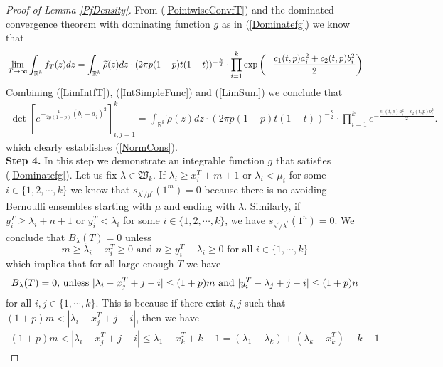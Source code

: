 \begin{proof}[Proof of Lemma \ref{PfDensity}]
From (\ref{PointwiseConvfT}) and the dominated convergence theorem with dominating function $g$ as in (\ref{Dominatefg}) we know that
\begin{equation}
	\begin{split}{\label{LimIntfT}}
	\lim_{T\rightarrow\infty}\int_{\mathbb{R}^{k}}f_T(z)dz=\int_{\mathbb{R}^k}\widetilde{\rho}(z)dz \cdot(2\pi p(1-p)t(1-t))^{-\frac{k}{2}}\cdot\prod_{i=1}^{k}\exp\left(-\frac{c_{1}(t,p)a_i^2+c_2(t,p)b_i^2}{2}\right)
\end{split}
\end{equation}
Combining (\ref{LimIntfT}), (\ref{IntSimpleFunc})  and (\ref{LimSum}) we conclude that
\begin{equation}
	\begin{split}
		\det\left[e^{-\frac{1}{2p(1-p)}(b_i-a_j)^2}\right]_{i,j=1}^{k}=\int_{\mathbb{R}^k}\widetilde{\rho}(z)dz\cdot(2\pi p(1-p)t(1-t))^{-\frac{k}{2}}\cdot\prod_{i=1}^{k}e^{-\frac{c_1(t,p)a_i^2+c_2(t,p)b_i^2}{2}}.
	\end{split}
\end{equation}
which clearly establishes (\ref{NormCons}).\\
\textbf{Step 4. }In this step we demonstrate an integrable function $g$ that satisfies (\ref{Dominatefg}). Let us fix $\lambda\in\mathfrak{W}_k$. If $\lambda_i\geq x_{i}^{T}+m+1$ or $\lambda_i<\mu_{i}$ for some $i\in\{1,2,\cdots,k\}$ we know that $s_{\lambda^{\prime}/\mu^{\prime}}(1^m)=0$ because there is no avoiding Bernoulli ensembles starting with $\mu$ and ending with $\lambda$. Similarly, if $y_{i}^T\geq \lambda_i+n+1$ or $y_{i}^T< \lambda_i$ for some $i\in\{1,2,\cdots,k\}$, we have $s_{\kappa^{\prime}/\lambda^{\prime}}(1^n)=0$. We conclude that $B_{\lambda}(T)=0$ unless
$$m\geq \lambda_i-x^{T}_i\geq 0\text{ and } n\geq y^{T}_i-\lambda_i\geq 0\text{ for all } i\in\{1,\cdots,k\}$$
which implies that for all large enough $T$ we have
\begin{equation}{\label{BLambda0unless}}
	\begin{split}
		B_{\lambda}(T)=0 \text{, unless }|\lambda_{i}-x_{j}^T+j-i|\leq (1+p)m \text{ and }|y_{i}^T-\lambda_{j}+j-i|\leq (1+p)n
	\end{split}
\end{equation}
for all $i,j\in\{1,\cdots, k\}$. This is because if there exist $i,j$ such that $(1+p)m<|\lambda_i-x^{T}_{j}+j-i|$, then we have 
\begin{equation*}
	\begin{split}
		(1+p)m<|\lambda_i-x^{T}_{j}+j-i|\leq \lambda_1-x^{T}_k+k-1=(\lambda_1-\lambda_k)+(\lambda_k-x^{T}_k)+k-1

\end{split}
\end{equation*}
\end{proof}
